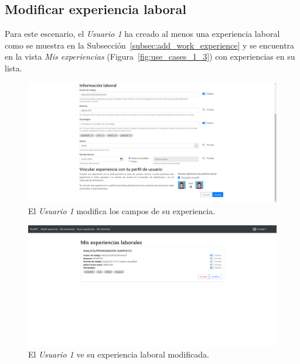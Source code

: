 \documentclass[a4paper, 12pt]{book}
\begin{document}
    \subsection{Modificar experiencia laboral}
    \label{subsec:modify_work_experience}
    Para este escenario, el \emph{Usuario 1} ha creado al menos una experiencia laboral como se muestra en la Subsección~\ref{subsec:add_work_experience}
    y se encuentra en la vista \emph{Mis experiencias} (Figura~\ref{fig:use_cases_1_3}) con experiencias en su lista.

    \begin{figure}
        \centering
        \includegraphics[width=15cm, keepaspectratio]{img/2.1.png}
        \caption{El \emph{Usuario 1} modifica los campos de su experiencia.}
        \label{fig:use_cases_2_1}
    \end{figure}

    \begin{figure}
        \centering
        \includegraphics[width=15cm, keepaspectratio]{img/2.2.png}
        \caption{El \emph{Usuario 1} ve su experiencia laboral modificada.}
        \label{fig:use_cases_2_2}
    \end{figure}
\end{document}
